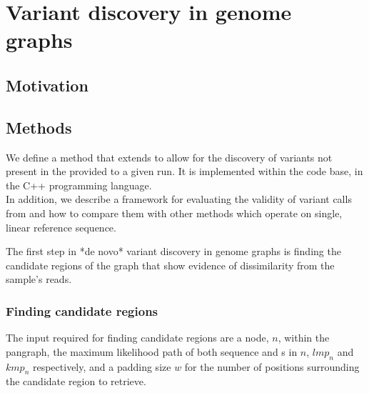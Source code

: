 
\chapter{Variant discovery in genome graphs}
\label{chap:denovo}
\ifpdf
    \graphicspath{{Chapter1/Figs/Raster/}{Chapter1/Figs/PDF/}{Chapter1/Figs/}}
\else
    \graphicspath{{Chapter1/Figs/Vector/}{Chapter1/Figs/}}
\fi


\section{Motivation}

\section{Methods}

We define a method that extends \pandora{} to allow for the discovery of variants not present in the \prg{} provided to a given run. It is implemented within the \pandora{} code base, in the C++ programming language. \\
In addition, we describe a framework for evaluating the validity of variant calls from \pandora{} and how to compare them with other methods which operate on single, linear reference sequence.

The first step in *de novo* variant discovery in genome graphs is finding the candidate regions of the graph that show evidence of dissimilarity from the sample's reads.


\subsection{Finding candidate regions}

The input required for finding candidate regions are a node, $n$, within the \pandora{} pangraph, the maximum likelihood path of both sequence and \kmer{}s in $n$, $lmp_n$ and $kmp_n$ respectively, and a padding size $w$ for the number of positions surrounding the candidate region to retrieve. \\

